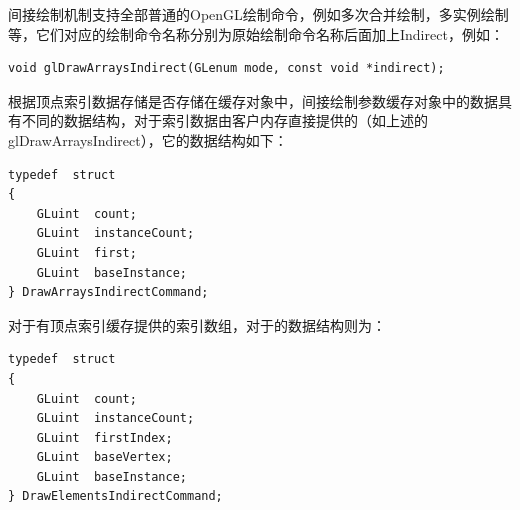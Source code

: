 间接绘制机制支持全部普通的OpenGL绘制命令，例如多次合并绘制，多实例绘制等，它们对应的绘制命令名称分别为原始绘制命令名称后面加上Indirect，例如：

\begin{lstlisting}
void glDrawArraysIndirect​(GLenum mode​, const void *indirect​);
\end{lstlisting}

根据顶点索引数据存储是否存储在缓存对象中，间接绘制参数缓存对象中的数据具有不同的数据结构，对于索引数据由客户内存直接提供的（如上述的glDrawArraysIndirect），它的数据结构如下：

\begin{lstlisting}
typedef  struct 
{
   	GLuint  count;
   	GLuint  instanceCount;
   	GLuint  first;
   	GLuint  baseInstance;
} DrawArraysIndirectCommand;
\end{lstlisting}

对于有顶点索引缓存提供的索引数组，对于的数据结构则为：

\begin{lstlisting}
typedef  struct 
{
    GLuint  count;
    GLuint  instanceCount;
    GLuint  firstIndex;
    GLuint  baseVertex;
    GLuint  baseInstance;
} DrawElementsIndirectCommand;
\end{lstlisting}


